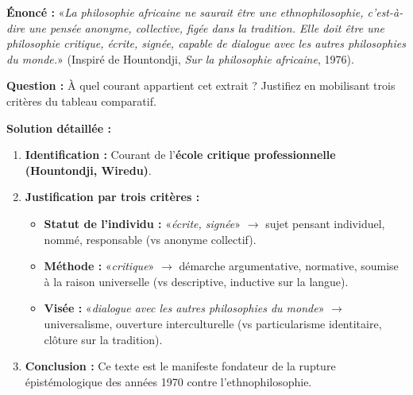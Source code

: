 \documentclass[11pt]{article}
\begin{document}
\begin{exoresolu}
\textbf{Énoncé :} «\emph{La philosophie africaine ne saurait être une ethnophilosophie, c'est-à-dire une pensée anonyme, collective, figée dans la tradition. Elle doit être une philosophie critique, écrite, signée, capable de dialogue avec les autres philosophies du monde.}» (Inspiré de Hountondji, \emph{Sur la philosophie africaine}, 1976).

\textbf{Question :} À quel courant appartient cet extrait ? Justifiez en mobilisant trois critères du tableau comparatif.

\tcblower
\textbf{Solution détaillée :}
\begin{enumerate}
    \item \textbf{Identification :} Courant de l'\textbf{école critique professionnelle (Hountondji, Wiredu)}.
    \item \textbf{Justification par trois critères :}
    \begin{itemize}
        \item \textbf{Statut de l'individu :} «\emph{écrite, signée}» $\to$ sujet pensant individuel, nommé, responsable (vs anonyme collectif).
        \item \textbf{Méthode :} «\emph{critique}» $\to$ démarche argumentative, normative, soumise à la raison universelle (vs descriptive, inductive sur la langue).
        \item \textbf{Visée :} «\emph{dialogue avec les autres philosophies du monde}» $\to$ universalisme, ouverture interculturelle (vs particularisme identitaire, clôture sur la tradition).
    \end{itemize}
    \item \textbf{Conclusion :} Ce texte est le manifeste fondateur de la rupture épistémologique des années 1970 contre l'ethnophilosophie.
\end{enumerate}
\end{exoresolu}
\end{document}
